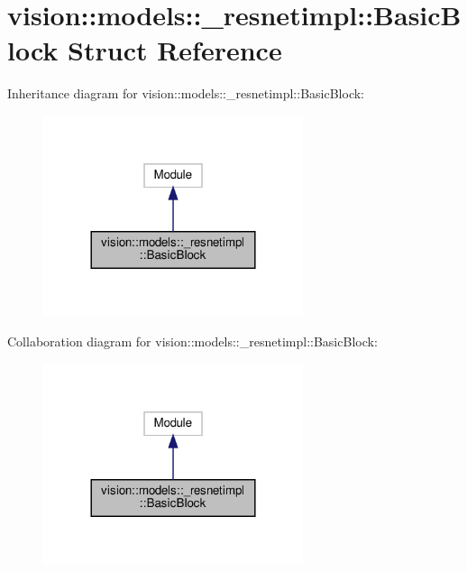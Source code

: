 \hypertarget{structvision_1_1models_1_1__resnetimpl_1_1BasicBlock}{}\section{vision\+:\+:models\+:\+:\+\_\+resnetimpl\+:\+:Basic\+Block Struct Reference}
\label{structvision_1_1models_1_1__resnetimpl_1_1BasicBlock}


Inheritance diagram for vision\+:\+:models\+:\+:\+\_\+resnetimpl\+:\+:Basic\+Block\+:
\nopagebreak
\begin{figure}[H]
\begin{center}
\leavevmode
\includegraphics[width=216pt]{structvision_1_1models_1_1__resnetimpl_1_1BasicBlock__inherit__graph}
\end{center}
\end{figure}


Collaboration diagram for vision\+:\+:models\+:\+:\+\_\+resnetimpl\+:\+:Basic\+Block\+:
\nopagebreak
\begin{figure}[H]
\begin{center}
\leavevmode
\includegraphics[width=216pt]{structvision_1_1models_1_1__resnetimpl_1_1BasicBlock__coll__graph}
\end{center}
\end{figure}
